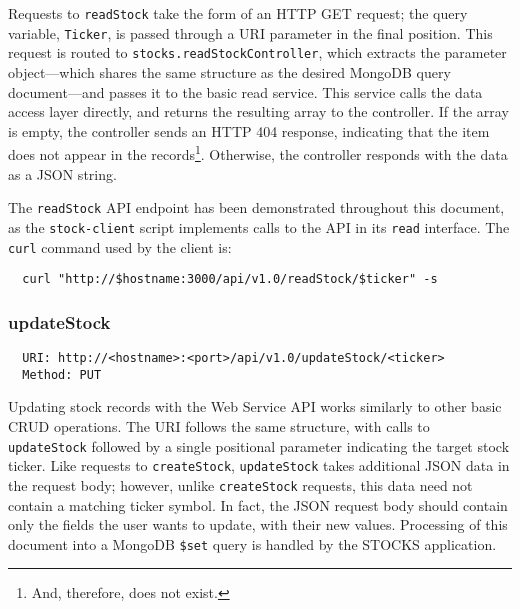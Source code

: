 \documentclass[
11pt,
titlepage,
]{article}
\begin{document}
Requests to \texttt{readStock} take the form of an HTTP GET request; the query
variable, \texttt{Ticker}, is passed through a URI parameter in the final
position. This request is routed to \texttt{stocks.readStockController},
which extracts the parameter object---which shares the same structure as the
desired MongoDB query document---and passes it to the basic read service.
This service calls the data access layer directly, and returns the resulting
array to the controller. If the array is empty, the controller sends an HTTP 404
response, indicating that the item does not appear in the records\footnote{And,
  therefore, does not exist.}. Otherwise, the controller responds with the data
as a JSON string.

The \texttt{readStock} API endpoint has been demonstrated throughout this
document, as the \texttt{stock-client} script implements calls to the API in its
\texttt{read} interface. The \texttt{curl} command used by the client is:

\begin{lstlisting}
  curl "http://$hostname:3000/api/v1.0/readStock/$ticker" -s
\end{lstlisting}

\subsubsection{updateStock}

\begin{lstlisting}
  URI: http://<hostname>:<port>/api/v1.0/updateStock/<ticker>
  Method: PUT
\end{lstlisting}

Updating stock records with the Web Service API works similarly to other basic
CRUD operations. The URI follows the same structure, with calls to
\texttt{updateStock} followed by a single positional parameter indicating the
target stock ticker. Like requests to \texttt{createStock},
\texttt{updateStock} takes additional JSON data in the request body; however,
unlike \texttt{createStock} requests, this data need not contain a matching
ticker symbol. In fact, the JSON request body should contain only the fields
the user wants to update, with their new values. Processing of this document
into a MongoDB \texttt{\$set} query is handled by the STOCKS application.
\end{document}
